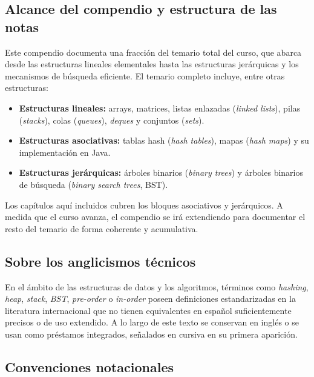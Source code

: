 \subsection*{Alcance del compendio y estructura de las notas}

Este compendio documenta una fracción del temario total del curso, que abarca desde las
estructuras lineales elementales hasta las estructuras jerárquicas y los mecanismos de
búsqueda eficiente. El temario completo incluye, entre otras estructuras:

\begin{itemize}
    \item \textbf{Estructuras lineales:} arrays, matrices, listas enlazadas
          (\textit{linked lists}), pilas (\textit{stacks}), colas (\textit{queues}),
          \textit{deques} y conjuntos (\textit{sets}).
    \item \textbf{Estructuras asociativas:} tablas hash (\textit{hash tables}),
          mapas (\textit{hash maps}) y su implementación en Java.
    \item \textbf{Estructuras jerárquicas:} árboles binarios (\textit{binary trees})
          y árboles binarios de búsqueda (\textit{binary search trees}, BST).
\end{itemize}

Los capítulos aquí incluidos cubren los bloques asociativos y jerárquicos. A medida que
el curso avanza, el compendio se irá extendiendo para documentar el resto del temario
de forma coherente y acumulativa.

\subsection*{Sobre los anglicismos técnicos}

En el ámbito de las estructuras de datos y los algoritmos, términos como \textit{hashing},
\textit{heap}, \textit{stack}, \textit{BST}, \textit{pre-order} o \textit{in-order} poseen
definiciones estandarizadas en la literatura internacional que no tienen equivalentes en
español suficientemente precisos o de uso extendido. A lo largo de este texto se conservan
en inglés o se usan como préstamos integrados, señalados en cursiva en su primera aparición.

\subsection*{Convenciones notacionales}

